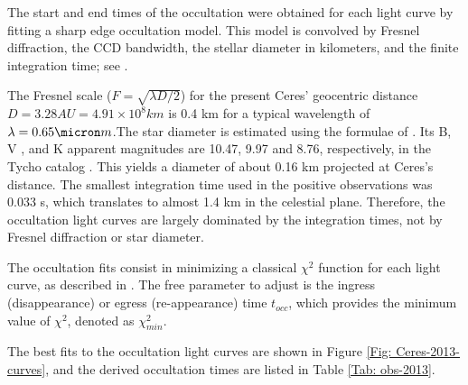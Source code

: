 \documentclass[useAMS,usenatbib]{mn2e}
\begin{document}
The start and end times of the occultation were obtained for each light curve by fitting a sharp edge occultation model. This model is convolved by Fresnel diffraction, the CCD bandwidth, the stellar diameter in kilometers, and the finite integration time; see \cite{Widemann2009}.

The Fresnel scale ($F = \sqrt{\lambda D/2}$) for the present Ceres’ geocentric distance $D = 3.28 AU = 4.91 \times 10^{8} km$ is 0.4 km for a typical wavelength of $\lambda = 0.65 \micron m$.The star diameter is estimated using the formulae of \cite{vanBelle1999}. Its B, V , and K apparent magnitudes are 10.47, 9.97 and 8.76, respectively, in the Tycho catalog \citep{Hog2000}. This yields a diameter of about 0.16 km projected at Ceres’s distance. The smallest integration time used in the positive observations was 0.033 s, which translates to almost 1.4 km in the celestial plane. Therefore, the occultation light curves are largely dominated by the integration times, not by Fresnel diffraction or star diameter.

The occultation fits consist in minimizing a classical $\chi^{2}$ function for each light curve, as described in \cite{Sicardy2011}. The free parameter to adjust is the ingress (disappearance) or egress (re-appearance) time $t_{occ}$, which provides the minimum value of $\chi^{2}$, denoted as $\chi^{2}_{min}$.

The best fits to the occultation light curves are shown in Figure \ref{Fig: Ceres-2013-curves}, and the derived occultation times are listed in Table \ref{Tab: obs-2013}.
\end{document}
